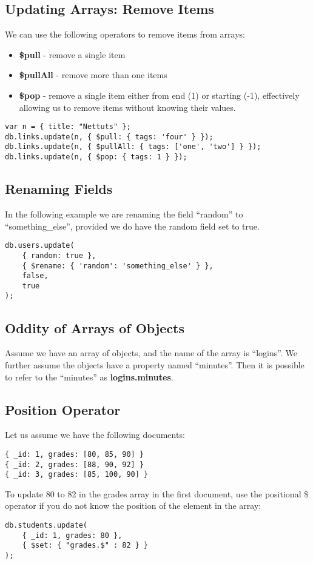 \documentclass[a4paper, 12pt]{article}
\begin{document}
\subsection{Updating Arrays: Remove Items}
We can use the following operators to remove items from arrays:
\begin{itemize}
    \item \textbf{\$pull} - remove a single item    
    \item \textbf{\$pullAll} - remove more than one items
    \item \textbf{\$pop} - remove a single item either from end (1) or starting (-1), effectively allowing us to remove items without knowing their values. 
\end{itemize}
\begin{verbatim}
var n = { title: "Nettuts" };
db.links.update(n, { $pull: { tags: 'four' } });
db.links.update(n, { $pullAll: { tags: ['one', 'two'] } });
db.links.update(n, { $pop: { tags: 1 } });
\end{verbatim}
\subsection{Renaming Fields}
In the following example we are renaming the field ``random'' to ``something\_else'', provided we do have the random field set to true.
\begin{verbatim}
db.users.update(
    { random: true },
    { $rename: { 'random': 'something_else' } }, 
    false, 
    true
);
\end{verbatim}
\subsection{Oddity of Arrays of Objects}
Assume we have an array of objects, and the name of the array is ``logins''. We further assume the objects have a property named ``minutes''. Then it is possible to refer to the ``minutes'' as \textbf{logins.minutes}.
\subsection{Position Operator}
Let us assume we have the following documents:
\begin{verbatim}
{ _id: 1, grades: [80, 85, 90] }
{ _id: 2, grades: [88, 90, 92] }
{ _id: 3, grades: [85, 100, 90] }
\end{verbatim}
To update 80 to 82 in the grades array in the first document, use the positional \$ operator if you do not know the position of the element in the array:
\begin{verbatim}
db.students.update( 
    { _id: 1, grades: 80 },
    { $set: { "grades.$" : 82 } } 
);
\end{verbatim}
\end{document}
